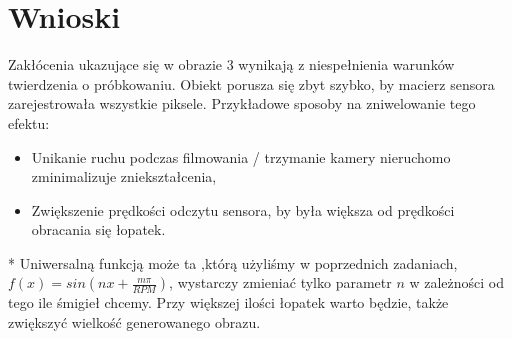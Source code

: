 \documentclass[14pt]{article}
\begin{document}
\newpage
\section{Wnioski}
Zakłócenia ukazujące się w obrazie 3 wynikają z 
niespełnienia warunków twierdzenia o próbkowaniu. Obiekt
porusza się zbyt szybko, by macierz sensora zarejestrowała 
wszystkie piksele. Przykładowe sposoby na zniwelowanie 
tego efektu:
\vspace{0.25cm}
\begin{itemize}
    \item Unikanie ruchu podczas filmowania / trzymanie kamery 
    nieruchomo zminimalizuje zniekształcenia,
    \item Zwiększenie prędkości odczytu sensora, by była 
    większa od prędkości obracania się łopatek.
\end{itemize}

\vspace{0.25cm}
* Uniwersalną funkcją może ta ,którą użyliśmy w poprzednich zadaniach,
$f(x) = sin(nx + \frac{m\pi}{RPM})$, wystarczy zmieniać tylko
parametr $n$ w zależności od tego ile śmigieł chcemy. Przy większej 
ilości łopatek warto będzie, także zwiększyć wielkość generowanego obrazu.
\end{document}
